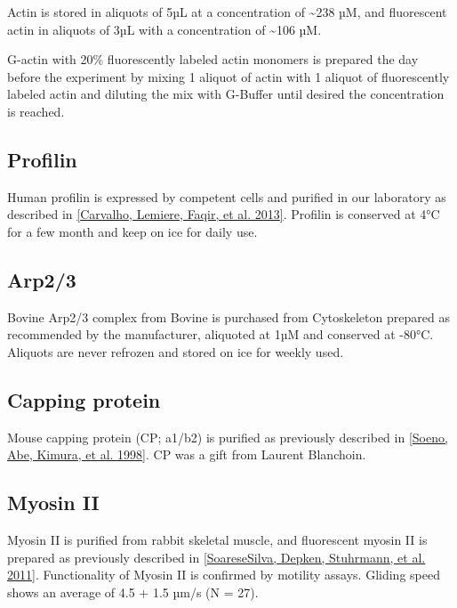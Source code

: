 \documentclass[A4paperpaper,11pt,english]{sphinxmanual}
\begin{document}
Actin is stored in aliquots of 5µL at a concentration of \textasciitilde{}238 µM, and
fluorescent actin in aliquots of 3µL with a concentration of \textasciitilde{}106 µM.

G-actin with 20\% fluorescently labeled actin monomers is prepared the day before
the experiment by mixing 1 aliquot of actin with 1 aliquot of fluorescently
labeled actin and diluting the mix with G-Buffer until desired the concentration is reached.


\subsection{Profilin}
\label{index-latex:profilin}
Human profilin is expressed by competent cells and purified in our laboratory as
described in {\hyperref[index-latex:carvalho2013a]{{[}Carvalho, Lemiere, Faqir,  et al.  2013{]}}}.  Profilin is conserved at 4°C for a few month and
keep on ice for daily use.


\subsection{Arp2/3}
\label{index-latex:arp2-3}
Bovine Arp2/3 complex  from Bovine is purchased from Cytoskeleton prepared as recommended by the manufacturer, aliquoted at 1µM
and conserved at -80°C.  Aliquots are never refrozen and stored on ice for
weekly used.


\subsection{Capping protein}
\label{index-latex:capping-protein}
Mouse capping protein (CP; a1/b2) is purified as previously described in {\hyperref[index-latex:soeno1998]{{[}Soeno, Abe, Kimura,  et al.  1998{]}}}. CP was a gift from Laurent Blanchoin.


\subsection{Myosin II}
\label{index-latex:myosin-ii}
Myosin II is purified from rabbit skeletal muscle, and fluorescent myosin II is
prepared as previously described in {\hyperref[index-latex:soaresesilva2011]{{[}SoareseSilva, Depken, Stuhrmann,  et al.  2011{]}}}. Functionality of
Myosin II is confirmed by motility assays. Gliding speed shows an average of 4.5
+ 1.5 µm/s (N = 27).
\end{document}

